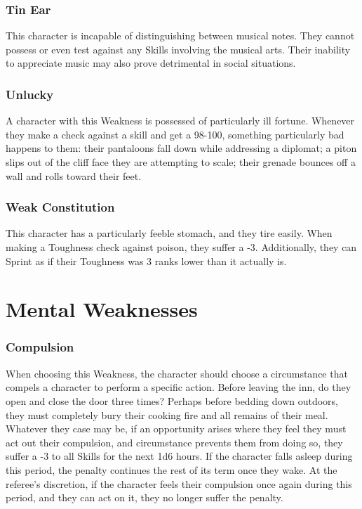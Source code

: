 \documentclass[oneside]{book}
\begin{document}
\begin{multicols}{2}
\subsubsection{Tin Ear}
This character is incapable of distinguishing between musical notes. They cannot possess or even test against any Skills involving the musical arts. Their inability to appreciate music may also prove detrimental in social situations. 

\subsubsection{Unlucky}
A character with this Weakness is possessed of particularly ill fortune. Whenever they make a check against a skill and get a 98-100, something particularly bad happens to them: their pantaloons fall down while addressing a diplomat; a piton slips out of the cliff face they are attempting to scale; their grenade bounces off a wall and rolls toward their feet. 

\subsubsection{Weak Constitution}
This character has a particularly feeble stomach, and they tire easily. When making a Toughness check against poison, they suffer a -3. Additionally, they can Sprint as if their Toughness was 3 ranks lower than it actually is.

\section{Mental Weaknesses}
\subsubsection{Compulsion}
When choosing this Weakness, the character should choose a circumstance that compels a character to perform a specific action. Before leaving the inn, do they open and close the door three times? Perhaps before bedding down outdoors, they must completely bury their cooking fire and all remains of their meal. Whatever they case may be, if an opportunity arises where they feel they must act out their compulsion, and circumstance prevents them from doing so, they suffer a -3 to all Skills for the next 1d6 hours. If the character falls asleep during this period, the penalty continues the rest of its term once they wake. At the referee's discretion, if the character feels their compulsion once again during this period, and they can act on it, they no longer suffer the penalty. 


\end{multicols}
\end{document}
